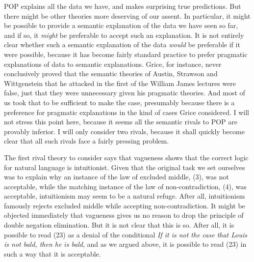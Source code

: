 POP explains all the data we have, and makes surprising true predictions. But there might be other theories more deserving of our assent. In particular, it might be possible to provide a semantic explanation of the data we have seen so far, and if so, it \textit{might} be preferable to accept such an explanation. It is not entirely clear whether such a semantic explanation of the data \textit{would }be preferable if it were possible, because it has become fairly standard practice to prefer pragmatic explanations of data to semantic explanations. Grice, for instance, never conclusively proved that the semantic theories of Austin, Strawson and Wittgenstein that he attacked in the first of the William James lectures were false, just that they were unnecessary given his pragmatic theories. And most of us took that to be sufficient to make the case, presumably because there is a preference for pragmatic explanations in the kind of cases Grice considered. I will not stress this point here, because it seems all the semantic rivals to POP are provably inferior. I will only consider two rivals, because it shall quickly become clear that all such rivals face a fairly pressing problem.

The first rival theory to consider says that vagueness shows that the correct logic for natural language is intuitionist. Given that the original task we set ourselves was to explain why an instance of the law of excluded middle, (3), was not acceptable, while the matching instance of the law of non-contradiction, (4), was acceptable, intuitionism may seem to be a natural refuge. After all, intuitionism famously rejects excluded middle while accepting non-contradiction. It might be objected immediately that vagueness gives us no reason to drop the principle of double negation elimination. But it is not clear that this is so. After all, it is possible to read (23) as a denial of the conditional \textit{If it is not the case that Louis is not bald, then he is bald}, and as we argued above, it is possible to read (23) in such a way that it is acceptable. 

